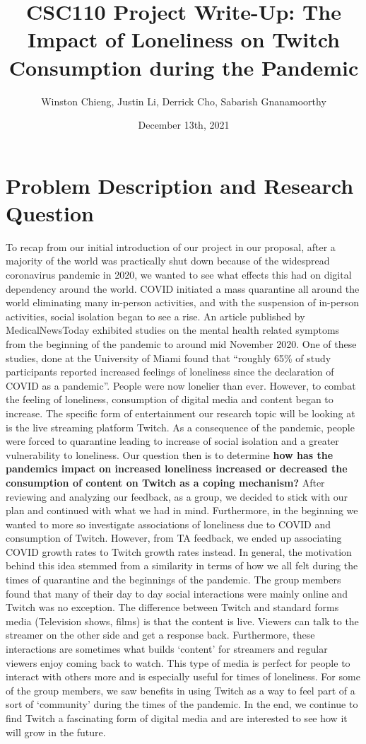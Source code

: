 \documentclass[fontsize=11pt]{article}
\title{CSC110 Project Write-Up: The Impact of Loneliness on Twitch Consumption during the Pandemic }
\author{Winston Chieng, Justin Li, Derrick Cho, Sabarish Gnanamoorthy}
\date{December 13th, 2021}
\begin{document}
\maketitle

\section*{Problem Description and Research Question}

To recap from our initial introduction of our project in our proposal, after a majority of the world was practically shut down because of the widespread coronavirus pandemic in 2020, we wanted to see what effects this had on digital dependency around the world. COVID initiated a mass quarantine all around the world eliminating many in-person activities, and with the suspension of in-person activities, social isolation began to see a rise. An article published by MedicalNewsToday exhibited studies on the mental health related symptoms from the beginning of the pandemic to around mid November 2020. One of these studies, done at the University of Miami found that “roughly 65\% of study participants reported increased feelings of loneliness since the declaration of COVID as a pandemic”. People were now lonelier than ever. However, to combat the feeling of loneliness, consumption of digital media and content began to increase. The specific form of entertainment our research topic will be looking at is the live streaming platform Twitch. As a consequence of the pandemic, people were forced to quarantine leading to increase of social isolation and a greater vulnerability to loneliness. Our question then is to determine \textbf{how has the pandemics impact on increased loneliness increased or decreased the consumption of content on Twitch as a coping mechanism?} After reviewing and analyzing our feedback, as a group, we decided to stick with our plan and continued with what we had in mind. Furthermore, in the beginning we wanted to more so investigate associations of loneliness due to COVID and consumption of Twitch. However, from TA feedback, we ended up associating COVID growth rates to Twitch growth rates instead. In general, the motivation behind this idea stemmed from a similarity in terms of how we all felt during the times of quarantine and the beginnings of the pandemic. The group members found that many of their day to day social interactions were mainly online and Twitch was no exception. The difference between Twitch and standard forms media (Television shows, films) is that the content is live. Viewers can talk to the streamer on the other side and get a response back. Furthermore, these interactions are sometimes what builds ‘content’ for streamers and regular viewers enjoy coming back to watch. This type of media is perfect for people to interact with others more and is especially useful for times of loneliness. For some of the group members, we saw benefits in using Twitch as a way to feel part of a sort of ‘community’ during the times of the pandemic. In the end, we continue to find Twitch a fascinating form of digital media and are interested to see how it will grow in the future.
\end{document}
